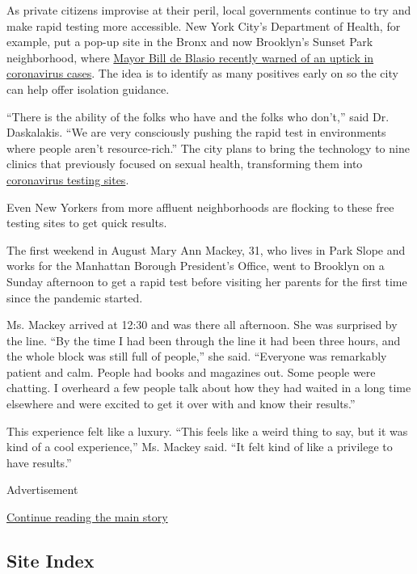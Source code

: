 As private citizens improvise at their peril, local governments continue
to try and make rapid testing more accessible. New York City's
Department of Health, for example, put a pop-up site in the Bronx and
now Brooklyn's Sunset Park neighborhood, where
\href{https://www.nydailynews.com/news/politics/ny-nyc-mayor-de-blasio-covid-sunset-park-brooklyn-outbreak-20200812-ems5msaphfcf5is5dq2lmu453e-story.html}{Mayor
Bill de Blasio recently warned of an uptick in coronavirus cases}. The
idea is to identify as many positives early on so the city can help
offer isolation guidance.

``There is the ability of the folks who have and the folks who don't,''
said Dr. Daskalakis. ``We are very consciously pushing the rapid test in
environments where people aren't resource-rich.'' The city plans to
bring the technology to nine clinics that previously focused on sexual
health, transforming them into
\href{https://www.nytimes3xbfgragh.onion/2020/07/23/nyregion/coronavirus-testing-nyc.html}{coronavirus
testing sites}.

Even New Yorkers from more affluent neighborhoods are flocking to these
free testing sites to get quick results.

The first weekend in August Mary Ann Mackey, 31, who lives in Park Slope
and works for the Manhattan Borough President's Office, went to Brooklyn
on a Sunday afternoon to get a rapid test before visiting her parents
for the first time since the pandemic started.

Ms. Mackey arrived at 12:30 and was there all afternoon. She was
surprised by the line. ``By the time I had been through the line it had
been three hours, and the whole block was still full of people,'' she
said. ``Everyone was remarkably patient and calm. People had books and
magazines out. Some people were chatting. I overheard a few people talk
about how they had waited in a long time elsewhere and were excited to
get it over with and know their results.''

This experience felt like a luxury. ``This feels like a weird thing to
say, but it was kind of a cool experience,'' Ms. Mackey said. ``It felt
kind of like a privilege to have results.''

Advertisement

\protect\hyperlink{after-bottom}{Continue reading the main story}

\hypertarget{site-index}{%
\subsection{Site Index}\label{site-index}}

